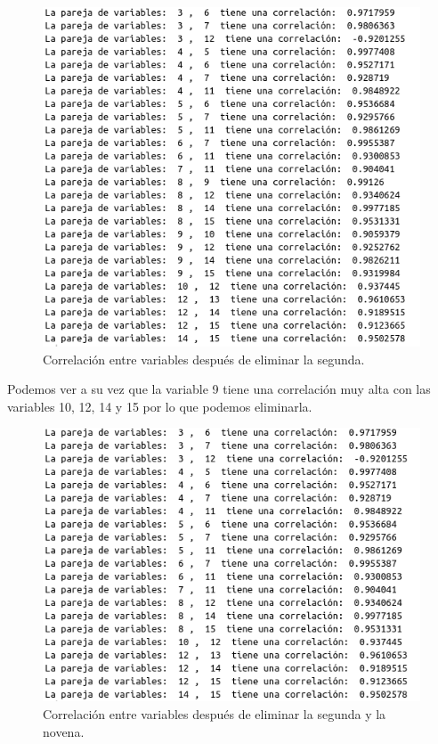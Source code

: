\documentclass[12pt,a4paper]{article}
\begin{document}
\begin{figure}[H]
	\centering
	\includegraphics[scale=0.6]{./Imagenes/EDA/Regresion/correlacion_entre_variables2.png}
	\caption{Correlación entre variables después de eliminar la segunda.}
\end{figure}

Podemos ver a su vez que la variable 9 tiene una correlación muy alta con las variables 10, 12, 14 y 15 por lo que podemos eliminarla.

\begin{figure}[H]
	\centering
	\includegraphics[scale=0.6]{./Imagenes/EDA/Regresion/correlacion_entre_variables3.png}
	\caption{Correlación entre variables después de eliminar la segunda y la novena.}
\end{figure}
\end{document}
